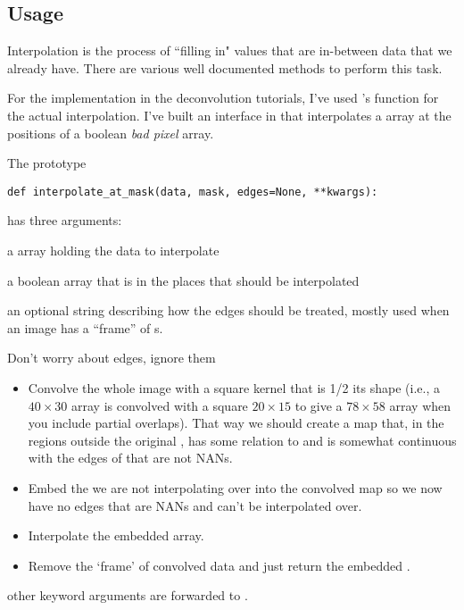  
\subsection{Usage}
Interpolation is the process of ``filling in" values that are in-between data that we already have. There are various well documented methods \cite{InterpolationOverview} to perform this task.

For the implementation in the deconvolution tutorials, I've used 's  function for the actual interpolation. I've built an interface in  that interpolates a  array at the  positions of a boolean \emph{bad pixel} array.

The prototype
\begin{lstlisting}
def interpolate_at_mask(data, mask, edges=None, **kwargs):
\end{lstlisting}
has three arguments:
\begin{description}
	\item{} a  array holding the data to interpolate
	\item{} a  boolean array that is  in the places that should be interpolated
	\item{} an optional string describing how the edges should be treated, mostly used when an image has a ``frame'' of s.
	\begin{description}
		\item{} Don't worry about edges, ignore them
		\item{} 
			\begin{itemize}
			\item Convolve the whole image with a square kernel that is 1/2 its shape (i.e., a $40 \times 30$ array is convolved with a square $20 \times 15$ to give a $78 \times 58$ array when you include partial overlaps). That way we should create a map that, in the regions outside the original , has some relation to  and is somewhat continuous with the edges of  that are not NANs. 
			\item Embed the  we are not interpolating over into the convolved map so we now have no edges that are NANs and can't be interpolated over.
			\item Interpolate the embedded  array.
			\item Remove the `frame' of convolved data and just return the embedded .
			\end{itemize}
	\end{description}
	\item{} other keyword arguments are forwarded to .
\end{description}